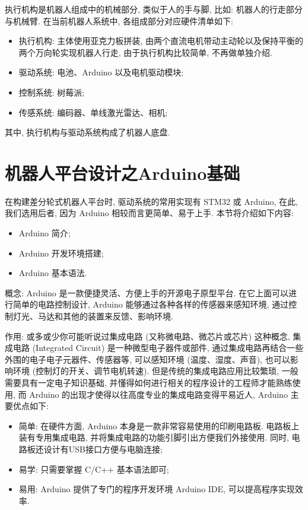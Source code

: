 \documentclass[openany, fontset=windowsold]{ctexbook}
\theoremstyle{kaiti}
\theoremstyle{normal}
\begin{document}
执行机构是机器人组成中的机械部分, 类似于人的手与脚, 比如: 机器人的行走部分与机械臂. 在当前机器人系统中, 各组成部分对应硬件清单如下:

\begin{itemize}
  \item 执行机构: 主体使用亚克力板拼装, 由两个直流电机带动主动轮以及保持平衡的两个万向轮实现机器人行走, 由于执行机构比较简单, 不再做单独介绍.
  \item 驱动系统: 电池、Arduino 以及电机驱动模块; 
  \item 控制系统: 树莓派; 
  \item 传感系统: 编码器、单线激光雷达、相机; 
\end{itemize}

其中, 执行机构与驱动系统构成了机器人底盘.

\section{机器人平台设计之Arduino基础}

在构建差分轮式机器人平台时, 驱动系统的常用实现有 STM32 或 Arduino, 在此, 我们选用后者, 因为 Arduino 相较而言更简单、易于上手. 本节将介绍如下内容:

\begin{itemize}
  \item Arduino 简介; 
  \item Arduino 开发环境搭建; 
  \item Arduino 基本语法.
\end{itemize}

概念: Arduino 是一款便捷灵活、方便上手的开源电子原型平台. 在它上面可以进行简单的电路控制设计, Arduino 能够通过各种各样的传感器来感知环境, 通过控制灯光、马达和其他的装置来反馈、影响环境.

作用: 或多或少你可能听说过集成电路 (又称微电路、微芯片或芯片) 这种概念, 集成电路 (Integrated Circuit) 是一种微型电子器件或部件, 通过集成电路再结合一些外围的电子电子元器件、传感器等, 可以感知环境 (温度、湿度、声音), 也可以影响环境 (控制灯的开关、调节电机转速). 但是传统的集成电路应用比较繁琐, 一般需要具有一定电子知识基础, 并懂得如何进行相关的程序设计的工程师才能熟练使用, 而 Arduino 的出现才使得以往高度专业的集成电路变得平易近人, Arduino 主要优点如下:

\begin{itemize}
  \item 简单: 在硬件方面, Arduino 本身是一款非常容易使用的印刷电路板. 电路板上装有专用集成电路, 并将集成电路的功能引脚引出方便我们外接使用. 同时, 电路板还设计有USB接口方便与电脑连接;
  \item 易学: 只需要掌握 C/C++ 基本语法即可;
  \item 易用: Arduino 提供了专门的程序开发环境 Arduino IDE, 可以提高程序实现效率.
\end{itemize}
\end{document}

